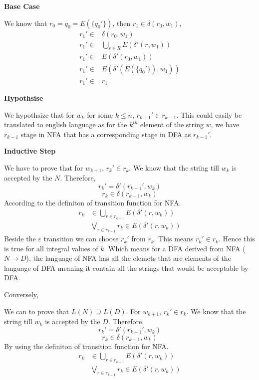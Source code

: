 \documentclass[a4paper]{exam}
\begin{document}
\begin{questions}
\begin{solution}
		\textbf{Base Case}

		We know that \(r_0=q_0=E(\{q_0'\})\), then \(r_1\in\delta(r_0,w_1)\),
		\begin{equation*}
			\begin{split}
				r_1'\in&\delta(r_0,w_1)\\
				r_1'\in&\bigcup_{r\in R}E(\delta'(r,w_1))\\
				r_1'\in&E(\delta'(r_0,w_1))\\
				r_1'\in&E(\delta'(E(\{q_0'\}),w_1))\\
				r_1'\in&r_1
			\end{split}
		\end{equation*}

		\textbf{Hypothsise}

		We hypothsize that for \(w_k\) for some \(k\le n\), \(r_{k-1}'\in r_{k-1}\). This could easily be translated to english language as for the \(k^{th}\) element of the string \(w\), we have \(r_{k-1}\) stage in NFA that has a corresponding stage in DFA as \(r_{k-1}'\).

		\textbf{Inductive Step}

		We have to prove that for \(w_{k+1}\), \(r_k'\in r_k\). We know that the string till \(w_{k}\) is accepted by the \(N\). Therefore,
		\[r_k'=\delta'(r_{k-1}',w_k)\]
		\[r_k\in\delta(r_{k-1},w_k)\]
		According to the definiton of transition function for NFA.
		\begin{equation*}
			\begin{split}
				r_k&\in\bigcup_{r\in r_{k-1}}E(\delta'(r,w_k))\\
				&\bigvee_{r\in r_{k-1}}r_k\in E(\delta'(r,w_k))
			\end{split}
		\end{equation*}
		Beside the \(\varepsilon\) transition we can choose \(r_k'\) from \(r_k\). This means \(r_k'\in r_k\). Hence this is true for all integral values of \(k\). Which means for a DFA derived from NFA (\(N\rightarrow D\)), the language of NFA has all the elemets that are elements of the language of DFA meaning it contain all the strings that would be acceptable by DFA.

		Conversely,

		We can to prove that \(L(N)\supseteq L(D)\). For \(w_{k+1}\), \(r_k'\in r_k\). We know that the string till \(w_{k}\) is accepted by the \(D\). Therefore,
		\[r_k'=\delta'(r_{k-1}',w_k)\]
		\[r_k\in\delta(r_{k-1},w_k)\]
		By using the definiton of transition function for NFA.
		\begin{equation*}
			\begin{split}
				r_k&\in\bigcup_{r\in r_{k-1}}E(\delta'(r,w_k))\\
				&\bigvee_{r\in r_{k-1}}r_k\in E(\delta'(r,w_k))
			\end{split}
		\end{equation*}


\end{solution}
\end{questions}
\end{document}
